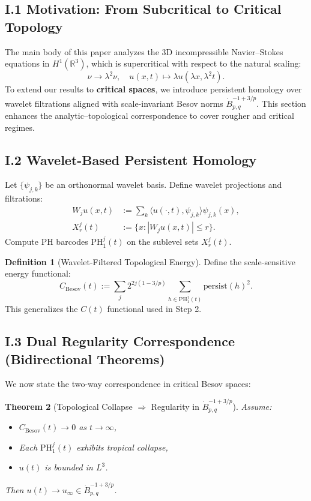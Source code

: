 \documentclass[11pt]{article}
\newtheorem{theorem}{Theorem}[section]
\theoremstyle{definition}
\newtheorem{definition}[theorem]{Definition}
\begin{document}
\subsection*{I.1 Motivation: From Subcritical to Critical Topology}
The main body of this paper analyzes the 3D incompressible Navier--Stokes equations in $H^1(\mathbb{R}^3)$, which is supercritical with respect to the natural scaling:
\[
\nu \to \lambda^2 \nu, \quad u(x,t) \mapsto \lambda u(\lambda x, \lambda^2 t).
\]
To extend our results to \textbf{critical spaces}, we introduce persistent homology over wavelet filtrations aligned with scale-invariant Besov norms $\dot{B}^{-1+3/p}_{p,q}$. This section enhances the analytic--topological correspondence to cover rougher and critical regimes.

\subsection*{I.2 Wavelet-Based Persistent Homology}
Let $\{\psi_{j,k}\}$ be an orthonormal wavelet basis. Define wavelet projections and filtrations:
\begin{align*}
W_j u(x,t) &:= \sum_k \langle u(\cdot, t), \psi_{j,k} \rangle \psi_{j,k}(x), \\
X^j_r(t) &:= \{x : |W_j u(x,t)| \leq r\}.
\end{align*}
Compute PH barcodes $\mathrm{PH}^j_1(t)$ on the sublevel sets $X^j_r(t)$.

\begin{definition}[Wavelet-Filtered Topological Energy]
Define the scale-sensitive energy functional:
\[
C_{\mathrm{Besov}}(t) := \sum_j 2^{2j(1 - 3/p)} \sum_{h \in \mathrm{PH}^j_1(t)} \mathrm{persist}(h)^2.
\]
This generalizes the $C(t)$ functional used in Step 2.
\end{definition}

\subsection*{I.3 Dual Regularity Correspondence (Bidirectional Theorems)}
We now state the two-way correspondence in critical Besov spaces:

\begin{theorem}[Topological Collapse $\Rightarrow$ Regularity in $\dot{B}^{-1+3/p}_{p,q}$]
Assume:
\begin{itemize}
  \item $C_{\mathrm{Besov}}(t) \to 0$ as $t \to \infty$,
  \item Each $\mathrm{PH}^j_1(t)$ exhibits tropical collapse,
  \item $u(t)$ is bounded in $L^3$.
\end{itemize}
Then $u(t) \to u_\infty \in \dot{B}^{-1+3/p}_{p,q}$.
\end{theorem}
\end{document}
